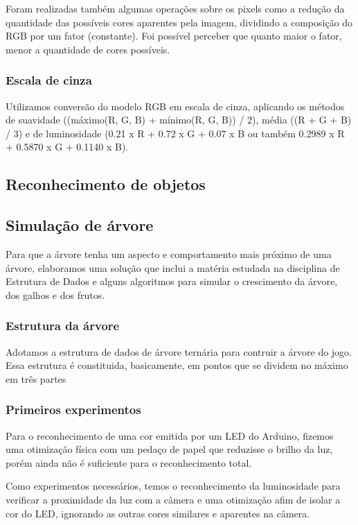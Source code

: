 \documentclass[12pt]{article}
\begin{document}
Foram realizadas tamb\'em algumas opera\c c\~oes sobre os pixels como a redu\c c\~ao da quantidade
das poss\'iveis cores aparentes pela imagem, dividindo a composi\c c\~ao do RGB por um fator (constante).
Foi poss\'ivel perceber que quanto maior o fator, menor a quantidade de cores poss\'iveis.

\subsubsection{Escala de cinza}
Utilizamos convers\~ao do modelo RGB em escala de cinza, aplicando os m\'etodos de suavidade
((m\'aximo(R, G, B) + m\'inimo(R, G, B)) / 2), m\'edia ((R + G + B) / 3) e de luminosidade
(0.21 x R + 0.72 x G + 0.07 x B ou tamb\'em 0.2989 x R + 0.5870 x G + 0.1140 x B).

\subsection{Reconhecimento de objetos}

\subsection{Simulação de árvore}
Para que a árvore tenha um aspecto e comportamento mais próximo de uma árvore, elaboramos uma solução que inclui
a matéria estudada na disciplina de Estrutura de Dados e alguns algoritmos para simular o crescimento da árvore,
dos galhos e dos frutos.
\subsubsection{Estrutura da árvore}
Adotamos a estrutura de dados de árvore ternária para contruir a árvore do jogo. Essa estrutura é constituida, basicamente,
em pontos que se dividem no máximo em três partes

\subsubsection{Primeiros experimentos}
Para o reconhecimento de uma cor emitida por um LED do Arduino, fizemos uma otimiza\c c\~ao f\'isica
com um peda\c co de papel que reduzisse o brilho da luz, por\'em ainda n\~ao \'e suficiente para
o reconhecimento total.

Como experimentos necess\'arios, temos o reconhecimento da luminosidade para verificar
a proximidade da luz com a c\^amera e uma otimiza\c c\~ao afim de isolar a cor do LED,
ignorando as outras cores similares e aparentes na c\^amera.
\end{document}

